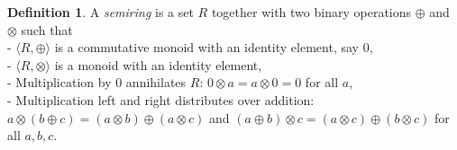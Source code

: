 \documentclass[11pt,a4paper]{article}
\newtheorem{lemma}[theorem]{Lemma}
\newtheorem{corollary}[theorem]{Corollary}
\theoremstyle{definition} %
\newtheorem{definition}[theorem]{Definition}
\newcommand\+[1]{\mathcal{#1}} %
\newcommand{\N}{{\mathbb N}}     %
\begin{document}
%
%
%

%
%
%
\begin{definition}\label{def:semiring}
A {\em semiring} is a set $R$ together with two binary operations $\oplus$ and $\otimes$ such that
\\- $\langle R, \oplus\rangle$ is a commutative monoid with an identity element, say $0$,
\\- $\langle R, \otimes\rangle$ is a monoid with an identity element,
\\- Multiplication by 0 annihilates $R$: $0\otimes a = a\otimes 0 = 0$ for all $a$,
\\- Multiplication left and right distributes over addition: 
$a\otimes(b\oplus c)=(a\otimes b)\oplus(a\otimes c)$
and $(a\oplus b)\otimes c=(a\otimes c)\oplus(b\otimes c)$ for all $a,b,c$.
\end{definition}
\end{document}
